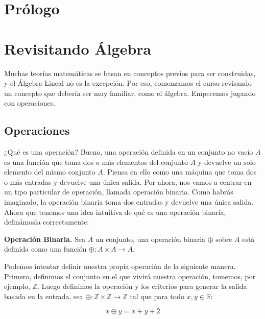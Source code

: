 \documentclass{report}
\begin{document}

\chapter*{Prólogo}

\tableofcontents

\pagebreak
\chapter{Revisitando Álgebra}

Muchas teorías matemáticas se basan en conceptos previos para ser construidas, y el Álgebra Lineal no es la excepción. Por eso, comenzamos el curso revisando un concepto que debería ser muy familiar, como el álgebra. Empecemos jugando con operaciones.

\section{Operaciones}

¿Qué es una operación? Bueno, una operación definida en un conjunto no vacío $A$ es una función que toma dos o más elementos del conjunto $A$ y devuelve un solo elemento del mismo conjunto $A$. Piensa en ello como una máquina que toma dos o más entradas y devuelve una única salida. Por ahora, nos vamos a centrar en un tipo particular de operación, llamada operación binaria. Como habrás imaginado, la operación binaria toma dos entradas y devuelve una única salida. Ahora que tenemos una idea intuitiva de qué es una operación binaria, definámosla correctamente:\\

\begin{defBox}
    \textbf{Operación Binaria.} Sea $A$ un conjunto, una operación binaria $\oplus$ sobre $A$ está definida como una función $\oplus: A\times A \rightarrow A$.
\end{defBox}

Podemos intentar definir nuestra propia operación de la siguiente manera. Primero, definimos el conjunto en el que vivirá nuestra operación, tomemos, por ejemplo, $\mathbb{Z}$. Luego definimos la operación y los criterios para generar la salida basada en la entrada, sea $\oplus: \mathbb{Z} \times \mathbb{Z} \rightarrow \mathbb{Z}$ tal que para todo $x, y \in \mathbb{R}$:

$$x \oplus y = x + y + 2$$
\end{document}
